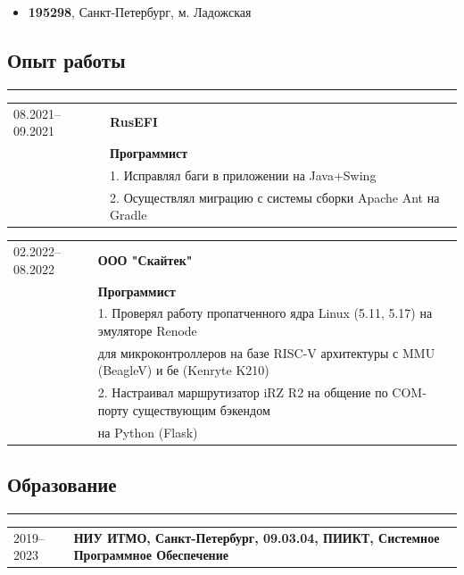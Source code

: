 \documentclass[10pt, final, twoside]{article}
\begin{document}
  \begin{itemize}
    \item \textbf{195298}, Санкт-Петербург, м. Ладожская
  \end{itemize}

  
  \subsection*{\textcolor{darkgray2}{Опыт работы}}
  \vspace*{-5.5mm}
  \par\noindent\rule{\textwidth}{0.1pt}
  \begin{table}[H]
    \begin{tabular}{ll}
      08.2021--09.2021 & \textbf{RusEFI}\\
                       & \textbf{Программист}\\
                       & 1. Исправлял баги в приложении на Java+Swing\\
                       & 2. Осуществлял миграцию с системы сборки Apache Ant на Gradle 
    \end{tabular}
  \end{table}
  \begin{table}[H]
    \begin{tabular}{ll}
      02.2022--08.2022 & \textbf{ООО "Скайтек"}\\
                       & \textbf{Программист}\\
                       & 1. Проверял работу пропатченного ядра Linux (5.11, 5.17) на эмуляторе   Renode\\
                       & для микроконтроллеров на базе RISC-V архитектуры с MMU (BeagleV) и бе   (Kenryte K210)\\
                       & 2. Настраивал маршрутизатор iRZ R2 на общение по COM-порту    существующим бэкендом\\
                       & на Python (Flask)
    \end{tabular}
  \end{table}
  

  \subsection*{\textcolor{darkgray2}{Образование}}
  \vspace*{-5.5mm}
  \par\noindent\rule{\textwidth}{0.1pt}
  \begin{table}[H]
    \begin{tabular}{ll}
      2019--2023 & \textbf{НИУ ИТМО, Санкт-Петербург, 09.03.04, ПИИКТ, Системное Программное Обеспечение}
    \end{tabular}
  \end{table}
\end{document}
